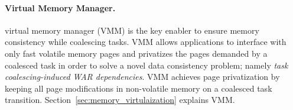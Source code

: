 \paragraph{Virtual Memory Manager.}
\sys virtual memory manager (VMM) is the key enabler to ensure memory consistency while coalescing tasks. VMM allows applications to interface with only fast volatile memory pages and privatizes the pages demanded by a coalesced task in order to solve a novel data consistency problem; namely \emph{task coalescing-induced WAR dependencies}. VMM achieves page privatization by keeping all page modifications in non-volatile memory on a coalesced task transition. Section~\ref{sec:memory_virtulaization} explains VMM.
